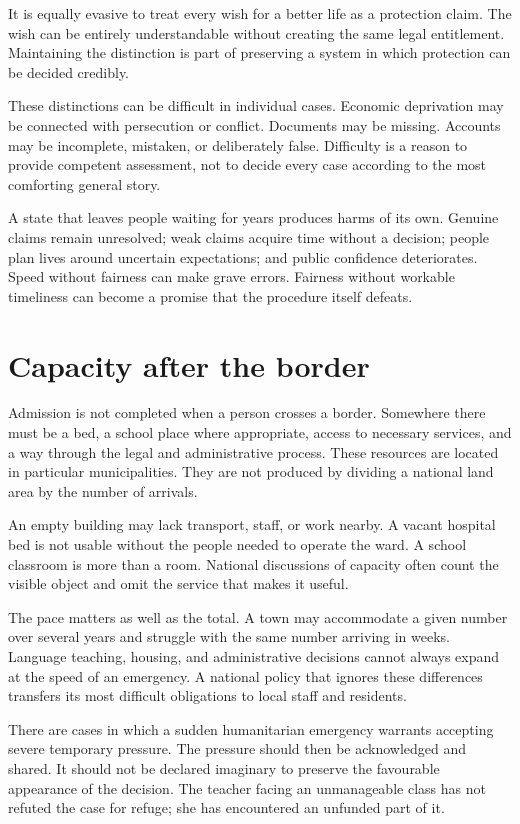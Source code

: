 \documentclass[12pt,a4paper]{book}
\begin{document}
It is equally evasive to treat every wish for a better life as a protection claim. The wish can be entirely understandable without creating the same legal entitlement. Maintaining the distinction is part of preserving a system in which protection can be decided credibly.

These distinctions can be difficult in individual cases. Economic deprivation may be connected with persecution or conflict. Documents may be missing. Accounts may be incomplete, mistaken, or deliberately false. Difficulty is a reason to provide competent assessment, not to decide every case according to the most comforting general story.

A state that leaves people waiting for years produces harms of its own. Genuine claims remain unresolved; weak claims acquire time without a decision; people plan lives around uncertain expectations; and public confidence deteriorates. Speed without fairness can make grave errors. Fairness without workable timeliness can become a promise that the procedure itself defeats.

\section*{Capacity after the border}

Admission is not completed when a person crosses a border. Somewhere there must be a bed, a school place where appropriate, access to necessary services, and a way through the legal and administrative process. These resources are located in particular municipalities. They are not produced by dividing a national land area by the number of arrivals.

An empty building may lack transport, staff, or work nearby. A vacant hospital bed is not usable without the people needed to operate the ward. A school classroom is more than a room. National discussions of capacity often count the visible object and omit the service that makes it useful.

The pace matters as well as the total. A town may accommodate a given number over several years and struggle with the same number arriving in weeks. Language teaching, housing, and administrative decisions cannot always expand at the speed of an emergency. A national policy that ignores these differences transfers its most difficult obligations to local staff and residents.

There are cases in which a sudden humanitarian emergency warrants accepting severe temporary pressure. The pressure should then be acknowledged and shared. It should not be declared imaginary to preserve the favourable appearance of the decision. The teacher facing an unmanageable class has not refuted the case for refuge; she has encountered an unfunded part of it.
\end{document}
